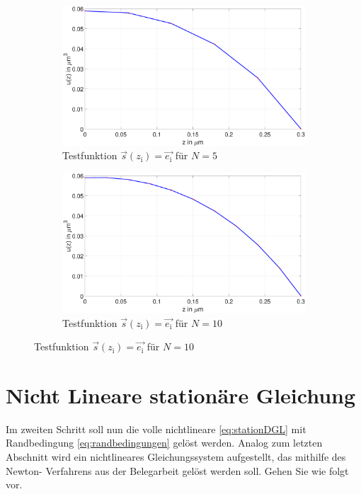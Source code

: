 \begin{figure}
\begin{subfigure}[b]{.5\textwidth}
			\includegraphics[width=1\linewidth]{figures/station_gl_2_1/aufgabe_7_test_n5}
			\caption{Testfunktion $\vec{s}(z_\mathrm{i})=\vec{e_\mathrm{i}}$ für
					$N=5$}
		\end{subfigure}
	\begin{subfigure}[b]{.5\textwidth}
			\centering
	
			\includegraphics[width=1\linewidth]{figures/station_gl_2_1/aufgabe_7_test_n10}
			\caption{Testfunktion $\vec{s}(z_\mathrm{i})=\vec{e_\mathrm{i}}$ für
					$N=10$}
		\end{subfigure}
\end{figure}






\begin{figure}
	
\end{figure}
\clearpage
\section{Nicht Lineare stationäre Gleichung}
\begin{mybox}
	Im zweiten Schritt soll nun die volle nichtlineare \cref{eq:stationDGL}
	mit Randbedingung \cref{eq:randbedingungen} gelöst werden. Analog
	zum letzten Abschnitt wird ein nichtlineares Gleichungssystem
	aufgestellt, das mithilfe des Newton-
	Verfahrens aus der Belegarbeit gelöst werden soll. Gehen Sie wie folgt
	vor.\cite{Prof.Dr.AndreasZeiser.April2021}
\end{mybox}

